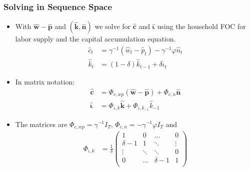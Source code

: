 \documentclass[english,xcolor=svgnames]{beamer}
\begin{document}
\begin{frame}
    \frametitle{Solving in Sequence Space}
		\begin{itemize}
			\item With $\mathbf{\hat{w}-\hat{p}}$ and $(\mathbf{\hat{k}},\mathbf{\hat{n}})$  we solve for $\mathbf{\hat{c}}$ and $\mathbf{\hat{\iota}}$ using the household FOC for labor supply and the capital accumulation equation. 
			\begin{align*}
				 \hat{c}_t  &= \gamma^{-1}(\hat{w}_t - \hat{p}_t)- \gamma^{-1}\varphi \hat{n}_t   \\
				\hat{k}_t &= (1-\delta)\hat{k}_{t-1} + \delta\hat{\iota}_t
			\end{align*}
			\item In matrix notation:
			\begin{align*}
				\mathbf{\hat{c}} &= \Phi_{c,wp}(\mathbf{\hat{w}-\hat{p}}) + \Phi_{c,n}\mathbf{\hat{n}}   \\
				\mathbf{\hat{\iota}} &= \Phi_{\iota,k}\mathbf{\hat{k}} + \Phi_{\iota,k_{-1}}\hat{k}_{-1}
			\end{align*}
			\item The matrices are $\Phi_{c,wp}=\gamma^{-1}I_T$, $\Phi_{c,n}=-\gamma^{-1} \varphi I_T$ and
			\begin{align*}
				\Phi_{\iota,k}&=\frac{1}{\delta} \begin{pmatrix}
					 1 & 0 & \hdots & 0 \\
					 \delta-1 & 1 & \ddots & \vdots \\
					\vdots &\ddots & \ddots  & 0 \\
					0 & \hdots  & \delta-1 & 1 \\
				\end{pmatrix}
			\end{align*}
		\end{itemize}
\end{frame}
\end{document}
